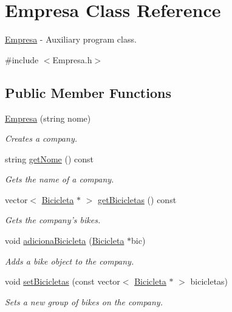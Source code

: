 \hypertarget{class_empresa}{\section{Empresa Class Reference}
\label{class_empresa}
}


\hyperlink{class_empresa}{Empresa} -\/ Auxiliary program class.  




{\ttfamily \#include $<$Empresa.\+h$>$}

\subsection*{Public Member Functions}
\begin{DoxyCompactItemize}
\item 
\hyperlink{class_empresa_ac5bccaf3758b25fea4803a63d4362236}{Empresa} (string nome)
\begin{DoxyCompactList}\small\item\em Creates a company. \end{DoxyCompactList}\item 
string \hyperlink{class_empresa_a22e7cb6769eca729ad9f9d8a0cb0168a}{get\+Nome} () const 
\begin{DoxyCompactList}\small\item\em Gets the name of a company. \end{DoxyCompactList}\item 
vector$<$ \hyperlink{class_bicicleta}{Bicicleta} $\ast$ $>$ \hyperlink{class_empresa_aa5786b3765e8321ca420b0c5be4bb21c}{get\+Bicicletas} () const 
\begin{DoxyCompactList}\small\item\em Gets the company's bikes. \end{DoxyCompactList}\item 
void \hyperlink{class_empresa_a1b02af861954e1ddfd89c988faa62895}{adiciona\+Bicicleta} (\hyperlink{class_bicicleta}{Bicicleta} $\ast$bic)
\begin{DoxyCompactList}\small\item\em Adds a bike object to the company. \end{DoxyCompactList}\item 
void \hyperlink{class_empresa_a585cffc1ecf217ea29827fb8e7fd6091}{set\+Bicicletas} (const vector$<$ \hyperlink{class_bicicleta}{Bicicleta} $\ast$ $>$ bicicletas)
\begin{DoxyCompactList}\small\item\em Sets a new group of bikes on the company. \end{DoxyCompactList}\item 

\end{DoxyCompactItemize}
